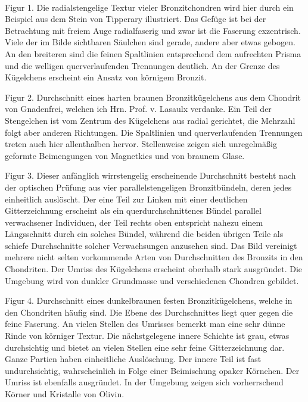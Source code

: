 \documentclass[a4paper, 12pt, oneside]{article}
\begin{document}
\paragraph{}
Figur 1. Die radialstengelige Textur vieler Bronzitchondren wird hier durch ein Beispiel aus dem Stein von Tipperary illustriert. Das Gefüge ist bei der Betrachtung mit freiem Auge radialfaserig und zwar ist die Faserung exzentrisch. Viele der im Bilde sichtbaren Säulchen sind gerade, andere aber etwas gebogen. An den breiteren sind die feinen Spaltlinien entsprechend dem aufrechten Prisma und die welligen querverlaufenden Trennungen deutlich. An der Grenze des Kügelchens erscheint ein Ansatz von körnigem Bronzit.

Figur 2. Durchschnitt eines harten braunen Bronzitkügelchens aus dem Chondrit von Gnadenfrei, welchen ich Hrn. Prof. v. Lasaulx verdanke. Ein Teil der Stengelchen ist vom Zentrum des Kügelchens aus radial gerichtet, die Mehrzahl folgt aber anderen Richtungen. Die Spaltlinien und querverlaufenden Trennungen treten auch hier allenthalben hervor. Stellenweise zeigen sich unregelmäßig geformte Beimengungen von Magnetkies und von braunem Glase.

Figur 3. Dieser anfänglich wirrstengelig erscheinende Durchschnitt besteht nach der optischen Prüfung aus vier parallelstengeligen Bronzitbündeln, deren jedes einheitlich auslöscht. Der eine Teil zur Linken mit einer deutlichen Gitterzeichnung erscheint als ein querdurchschnittenes Bündel parallel verwachsener Individuen, der Teil rechts oben entspricht nahezu einem Längsschnitt durch ein solches Bündel, während die beiden übrigen Teile als schiefe Durchschnitte solcher Verwachsungen anzusehen sind. Das Bild vereinigt mehrere nicht selten vorkommende Arten von Durchschnitten des Bronzits in den Chondriten. Der Umriss des Kügelchens erscheint oberhalb stark ausgründet. Die Umgebung wird von dunkler Grundmasse und verschiedenen Chondren gebildet.

Figur 4. Durchschnitt eines dunkelbraunen festen Bronzitkügelchens, welche in den Chondriten häufig sind. Die Ebene des Durchschnittes liegt quer gegen die feine Faserung. An vielen Stellen des Umrisses bemerkt man eine sehr dünne Rinde von körniger Textur. Die nächstgelegene innere Schichte ist grau, etwas durchsichtig und bietet an vielen Stellen eine sehr feine Gitterzeichnung dar. Ganze Partien haben einheitliche Auslöschung. Der innere Teil ist fast undurchsichtig, wahrscheinlich in Folge einer Beimischung opaker Körnchen. Der Umriss ist ebenfalls ausgründet. In der Umgebung zeigen sich vorherrschend Körner und Kristalle von Olivin.
\clearpage
\end{document}
